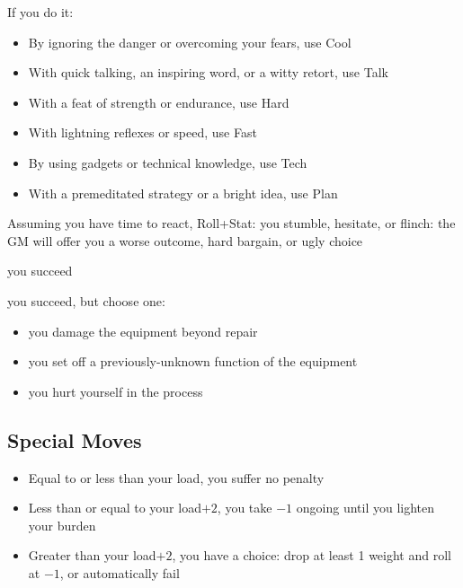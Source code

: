 If you do it:
\begin{itemize}
\item By ignoring the danger or overcoming your fears, use Cool
\item With quick talking, an inspiring word, or a witty retort, use Talk
\item With a feat of strength or endurance, use Hard
\item With lightning reflexes or speed, use Fast
\item By using gadgets or technical knowledge, use Tech
\item With a premeditated strategy or a bright idea, use Plan
\end{itemize}
Assuming you have time to react, Roll+Stat:
{you stumble, hesitate, or flinch: the GM will offer you a worse outcome, hard bargain, or ugly choice}

{you succeed}
{you succeed, but choose one:
\begin{itemize}
\item you damage the equipment beyond repair
\item you set off a previously-unknown function of the equipment
\item you hurt yourself in the process
\end{itemize}}

\subsection{Special Moves}



\begin{itemize}
\item Equal to or less than your load, you suffer no penalty
\item Less than or equal to your load$+2$, you take $-1$ ongoing until you lighten your burden
\item Greater than your load$+2$, you have a choice: drop at least 1 weight and roll at $-1$, or automatically fail
\end{itemize}

